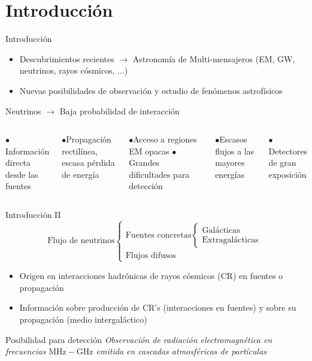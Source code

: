 \documentclass{beamer}
\begin{document}
	\section{Introducción}
	\begin{frame}{Introducción}
		\begin{itemize}
			\item Descubrimientos recientes $\rightarrow$ Astronomía de Multi-mensajeros (EM, GW, neutrinos, rayos cósmicos, ...)
			\item Nuevas posibilidades de observación y estudio de fenómenos astrofísicos
		\end{itemize}
		\pause\begin{block}{\centering Neutrinos $\rightarrow$ Baja probabilidad de interacción}

		\begin{columns}
			\centering
			$\bullet$Información directa desde las fuentes
			
			$\bullet$Propagación rectilínea, escasa pérdida de energía
			
			$\bullet$Acceso a regiones EM opacas
			\centering
			$\bullet$Grandes dificultades para detección
			
			$\bullet$Escasos flujos a las mayores energías
			
			$\bullet$Detectores de gran exposición
		\end{columns}
		\end{block}
	\end{frame}
\begin{frame}{Introducción II}
	\begin{equation*}
		\text{Flujo de neutrinos}\left\{\begin{array}{l}\text{Fuentes concretas}\left\{\begin{array}{l}\text{Galácticas}\\\text{Extragalácticas}\end{array}\right.\\\text{Flujos difusos}\end{array}\right.
	\end{equation*}
\begin{itemize}
	\item Origen en interacciones hadrónicas de rayos cósmicos (CR) en fuentes o propagación
	\item Información sobre producción de CR's (interacciones en fuentes) y sobre su propagación (medio intergaláctico)
\end{itemize}
\pause\begin{block}{\centering Posibilidad para detección}
	\centering \textit{Observación de radiación electromagnética en frecuencias $\mathrm{MHz-GHz}$ emitida en cascadas atmosféricas de partículas}
	\end{block}
\end{frame}
\end{document}
